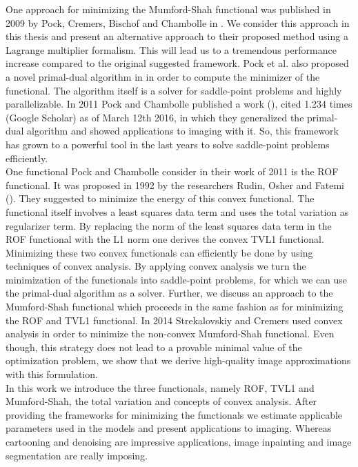 \documentclass[abstracton]{scrreprt}
\begin{document}
    One approach for minimizing the Mumford-Shah functional was published in 2009 by Pock, Cremers, Bischof and Chambolle in \cite{Pock-et-al-iccv09}. We consider this approach in this thesis and present an alternative approach to their proposed method using a Lagrange multiplier formalism. This will lead us to a tremendous performance increase compared to the original suggested framework. Pock et al. also proposed a novel primal-dual algorithm in \cite{Pock-et-al-iccv09} in order to compute the minimizer of the functional. The algorithm itself is a solver for saddle-point problems and highly parallelizable. In 2011 Pock and Chambolle published a work (\cite{Chambolle10afirst-order}), cited 1.234 times (Google Scholar) as of March 12th 2016, in which they generalized the primal-dual algorithm and showed applications to imaging with it. So, this framework has grown to a powerful tool in the last years to solve saddle-point problems efficiently.\\
    One functional Pock and Chambolle consider in their work of 2011 is the ROF functional. It was proposed in 1992 by the researchers Rudin, Osher and Fatemi (\cite{ROF}). They suggested to minimize the energy of this convex functional. The functional itself involves a least squares data term and uses the total variation as regularizer term. By replacing the norm of the least squares data term in the ROF functional with the L1 norm one derives the convex TVL1 functional. Minimizing these two convex functionals can efficiently be done by using techniques of convex analysis. By applying convex analysis we turn the minimization of the functionals into saddle-point problems, for which we can use the primal-dual algorithm as a solver. Further, we discuss an approach to the Mumford-Shah functional which proceeds in the same fashion as for minimizing the ROF and TVL1 functional. In 2014 Strekalovskiy and Cremers used convex analysis in order to minimize the non-convex Mumford-Shah functional. Even though, this strategy does not lead to a provable minimal value of the optimization problem, we show that we derive high-quality image approximations with this formulation.\\
    In this work we introduce the three functionals, namely ROF, TVL1 and Mumford-Shah, the total variation and concepts of convex analysis. After providing the frameworks for minimizing the functionals we estimate applicable parameters used in the models and present applications to imaging. Whereas cartooning and denoising are impressive applications, image inpainting and image segmentation are really imposing.
\end{document}
